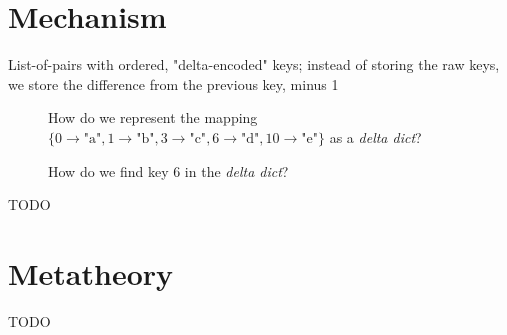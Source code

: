 \documentclass[nonacm]{acmart}
\newcommand{\dd}{\emph{delta dict}}
\newcommand{\mapP}{\{0 \rightarrow \text{"a"}, 1 \rightarrow \text{"b"}, 3 \rightarrow \text{"c"}, 6 \rightarrow \text{"d"}, 10 \rightarrow \text{"e"}\}}
\theoremstyle{slplain}
\numberwithin{thm}{section}
\begin{document}
\section{Mechanism}
\label{sec:Mechanism}
List-of-pairs with ordered, "delta-encoded" keys;
instead of storing the raw keys, we store
the difference from the previous key, minus 1
\begin{figure}[H]
  \centering
  \caption{How do we represent the mapping $\mapP$ as a \dd?}
  \label{fig:mech1}
\end{figure}
\begin{figure}[H]
  \centering
  \caption{How do we find key $6$ in the \dd?}
  \label{fig:find-6}
\end{figure}

TODO

\section{Metatheory}
\label{sec:Metatheory}
TODO

\end{document}
